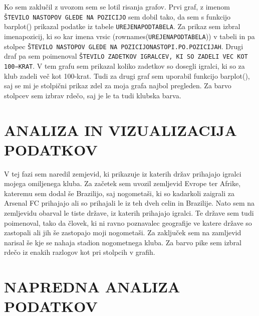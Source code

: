 \documentclass[11pt,a4paper]{article}
\begin{document}
Ko sem zaklučil z uvozom sem se lotil risanja grafov. Prvi graf, z imenom \verb|ŠTEVILO NASTOPOV GLEDE NA POZICIJO| sem dobil tako, da sem s funkcijo barplot() prikazal podatke iz tabele \verb|UREJENAPODTABELA|. Za prikaz sem izbral imenapozicij, ki so kar imena vrsic (rownames(\verb|UREJENAPODTABELA|)) v tabeli in pa stolpec \verb|ŠTEVILO NASTOPOV GLEDE NA POZICIJONASTOPI.PO.POZICIJAH|.
Drugi draf pa sem poimenoval \verb|ŠTEVILO ZADETKOV IGRALCEV, KI SO ZADELI VEC KOT 100−KRAT|. V tem grafu sem prikazal koliko zadetkov so dosegli igralci, ki so za klub zadeli več kot 100-krat. Tudi za drugi graf sem uporabil funkcijo barplot(), saj se mi je stolpični prikaz zdel za moja grafa najbol pregleden. Za barvo stolpcev sem izbrav rdečo, saj je le ta tudi klubska barva.




\newpage
\section{ANALIZA IN VIZUALIZACIJA PODATKOV}
V tej fazi sem naredil zemjevid, ki prikazuje iz katerih držav prihajajo igralci mojega omiljenega kluba. Za začetek sem uvozil zemljevid Evrope ter Afrike, kateremu sem dodal še Brazilijo, saj nogometaši, ki so kadarkoli zaigrali za Arsenal FC prihajajo ali so prihajali le iz teh dveh celin in Brazilije. Nato sem na zemljevidu obarval le tiste države, iz katerih prihajajo igralci. Te države sem tudi poimenoval, tako da človek, ki ni ravno poznavalec geografije ve katere države so zastopali ali jih še zastopajo moji nogometaši. Za zaključek sem na zamljevid narisal še kje se nahaja stadion nogometnega kluba. Za barvo pike sem izbral rdečo iz enakih razlogov kot pri stolpcih v grafih.



\section{NAPREDNA ANALIZA PODATKOV}
\end{document}
